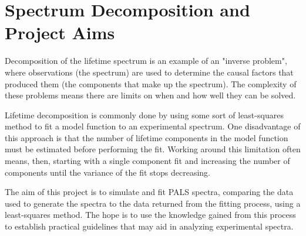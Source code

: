 \section{Spectrum Decomposition and Project Aims}

Decomposition of the lifetime spectrum is an example of an "inverse problem", where observations (the spectrum) are used to determine the causal factors that produced them (the components that make up the spectrum). The complexity of these problems means there are limits on when and how well they can be solved.

Lifetime decomposition is commonly done by using some sort of least-squares method to fit a model function to an experimental spectrum. One disadvantage of this approach is that the number of lifetime components in the model function must be estimated before performing the fit. Working around this limitation often means, then, starting with a single component fit and increasing the number of components until the variance of the fit stops decreasing.

The aim of this project is to simulate and fit PALS spectra, comparing the data used to generate the spectra to the data returned from the fitting process, using a least-squares method. The hope is to use the knowledge gained from this process to establish practical guidelines that may aid in analyzing experimental spectra.